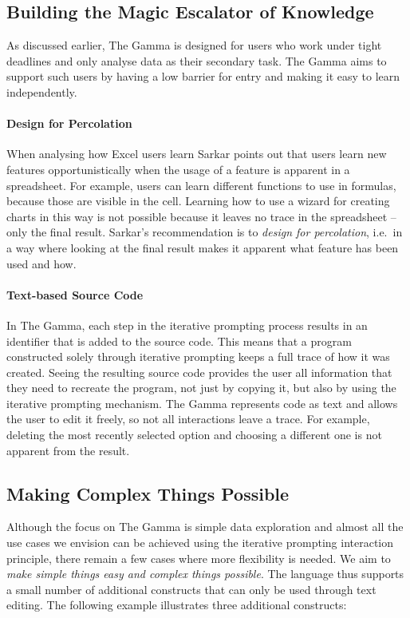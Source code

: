 \documentclass{sigchi}
\begin{document}
\subsection{Building the Magic Escalator of Knowledge}
As discussed earlier, The Gamma is designed for users who work under tight deadlines and only
analyse data as their secondary task. The Gamma aims to support such users by having a low
barrier for entry and making it easy to learn independently.

\paragraph{Design for Percolation}
When analysing how Excel users learn Sarkar \cite{learning} points out that users learn new
features opportunistically when the usage of a feature is apparent in a spreadsheet. For
example, users can learn different functions to use in formulas, because those are visible in
the cell. Learning how to use a wizard for creating charts in this way is not possible because
it leaves no trace in the spreadsheet -- only the final result. Sarkar's recommendation is to
\emph{design for percolation}, i.e.~in a way where looking at the final result makes it apparent
what feature has been used and how.

\paragraph{Text-based Source Code}
In The Gamma, each step in the iterative prompting process results in an identifier that is
added to the source code. This means that a program constructed solely through iterative prompting
keeps a full trace of how it was created. Seeing the resulting source code provides the user all
information that they need to recreate the program, not just by copying it, but also by using the
iterative prompting mechanism. The Gamma represents code as text and allows the user to edit it
freely, so not all interactions leave a trace. For example, deleting the most recently selected
option and choosing a different one is not apparent from the result.

\subsection{Making Complex Things Possible}
Although the focus on The Gamma is simple data exploration and almost all the use cases we
envision can be achieved using the iterative prompting interaction principle, there remain a
few cases where more flexibility is needed. We aim to \emph{make simple things easy and
complex things possible}. The language thus supports a small number of additional constructs that
can only be used through text editing. The following example illustrates three additional
constructs:
\end{document}
